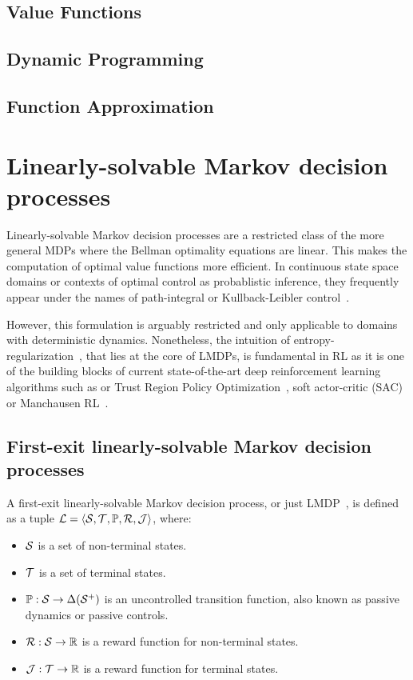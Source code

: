 \subsection{Value Functions}

\subsection{Dynamic Programming}

\subsection{Function Approximation}

\section{Linearly-solvable Markov decision processes}

Linearly-solvable Markov decision processes are a restricted class of the more general MDPs where the Bellman optimality equations are linear. This makes the computation of optimal value functions more efficient. In continuous state space domains or contexts of optimal control as probablistic inference, they frequently appear under the names of path-integral or Kullback-Leibler control~\citep{Kappen2012}. 

However, this formulation is arguably restricted and only applicable to domains with deterministic dynamics. Nonetheless, the intuition of entropy-regularization~\citep{Neu2017}, that lies at the core of LMDPs, is fundamental in RL as it is one of the building blocks of current state-of-the-art deep reinforcement learning algorithms such as or Trust Region Policy Optimization~\citep{Schulman2015}, soft actor-critic (SAC)~\citep{Haarnoja2018} or Manchausen RL~\citep{Vieillard2020}.

\subsection{First-exit linearly-solvable Markov decision processes}

A first-exit linearly-solvable Markov decision process, or just LMDP~\citep{Todorov2006,Kappen2005}, is defined as a tuple $\mathcal{L}=\langle\mathcal{S},\mathcal{T},\mathbb{P},\mathcal{R},\mathcal{J}\rangle$, where: \begin{itemize}
  \item $\mathcal{S}$ is a set of non-terminal states.
  \item $\mathcal{T}$ is a set of terminal states.
  \item $\mathbb{P}:\mathcal{S}\rightarrow\Delta(\mathcal{S}^+)$ is an uncontrolled transition function, also known as passive dynamics or passive controls.
  \item $\mathcal{R}:\mathcal{S}\rightarrow\mathbb{R}$ is a reward function for non-terminal states.
  \item $\mathcal{J}:\mathcal{T}\rightarrow\mathbb{R}$ is a reward function for terminal states.
\end{itemize}

